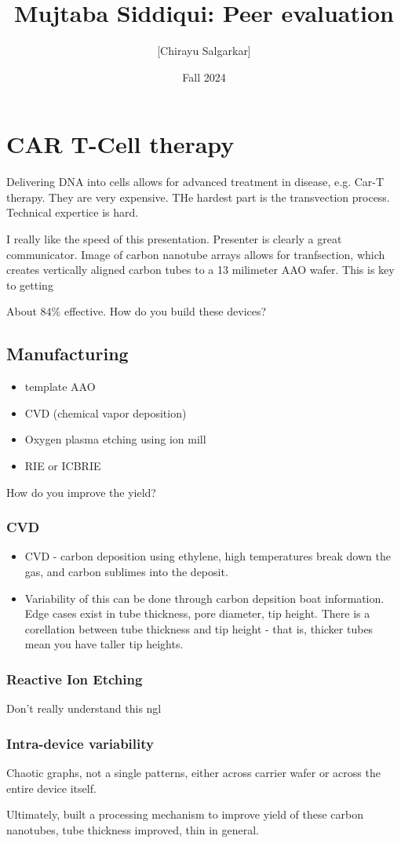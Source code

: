 \documentclass[10pt, oneside]{article}
\title{Mujtaba Siddiqui: Peer evaluation}
\author{[Chirayu Salgarkar]}
\date{Fall 2024}
\begin{document}
\maketitle
\tableofcontents

\vspace{.25in}

\section{CAR T-Cell therapy}
Delivering DNA into cells allows for advanced treatment in disease, e.g. Car-T therapy. They are very expensive. THe hardest part is the transvection process. Technical expertice is hard.


I really like the speed of this presentation. Presenter is clearly a great communicator. 
Image of carbon nanotube arrays allows for tranfsection, which creates vertically aligned carbon tubes to a 13 milimeter AAO wafer. This is key to getting 

About $84\%$ effective. How do you build these devices?

\subsection{Manufacturing}
\begin{itemize}
    \item template AAO
    \item CVD (chemical vapor deposition)
    \item Oxygen plasma etching using ion mill 
    \item RIE or ICBRIE
\end{itemize}

How do you improve the yield?
\subsubsection{CVD}
\begin{itemize}
    \item CVD - carbon deposition using ethylene, high temperatures break down the gas, and carbon sublimes into the deposit.
    \item Variability of this can be done through carbon depsition boat information. Edge cases exist in tube thickness, pore diameter, tip height. There is a corellation between tube thickness and tip height - that is, thicker tubes mean you have taller tip heights.
\end{itemize}
\subsubsection{Reactive Ion Etching}
Don't really understand this ngl

\subsubsection{Intra-device variability}
Chaotic graphs, not a single patterns, either across carrier wafer or across the entire device itself. 

Ultimately, built a processing mechanism to improve yield of these carbon nanotubes, tube thickness improved, thin in general. 
\end{document}
